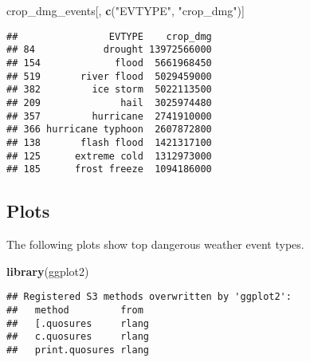 \documentclass[]{article}
\newenvironment{Shaded}{\begin{snugshade}}{\end{snugshade}}
\newcommand{\KeywordTok}[1]{\textcolor[rgb]{0.13,0.29,0.53}{\textbf{#1}}}
\newcommand{\StringTok}[1]{\textcolor[rgb]{0.31,0.60,0.02}{#1}}
\newcommand{\NormalTok}[1]{#1}
\begin{document}
\begin{Shaded}
\begin{Highlighting}[]
\NormalTok{crop_dmg_events[, }\KeywordTok{c}\NormalTok{(}\StringTok{"EVTYPE"}\NormalTok{, }\StringTok{"crop_dmg"}\NormalTok{)]}
\end{Highlighting}
\end{Shaded}

\begin{verbatim}
##                EVTYPE    crop_dmg
## 84            drought 13972566000
## 154             flood  5661968450
## 519       river flood  5029459000
## 382         ice storm  5022113500
## 209              hail  3025974480
## 357         hurricane  2741910000
## 366 hurricane typhoon  2607872800
## 138       flash flood  1421317100
## 125      extreme cold  1312973000
## 185      frost freeze  1094186000
\end{verbatim}

\subsection{Plots}\label{plots}

The following plots show top dangerous weather event types.

\begin{Shaded}
\begin{Highlighting}[]
\KeywordTok{library}\NormalTok{(ggplot2)}
\end{Highlighting}
\end{Shaded}

\begin{verbatim}
## Registered S3 methods overwritten by 'ggplot2':
##   method         from 
##   [.quosures     rlang
##   c.quosures     rlang
##   print.quosures rlang
\end{verbatim}
\end{document}
